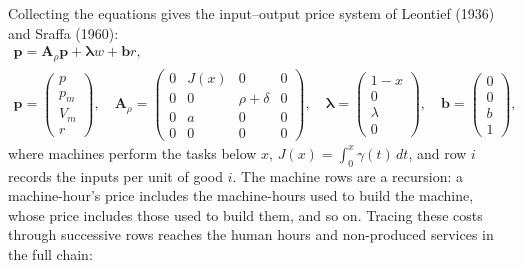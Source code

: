 \documentclass[12pt]{article}
\theoremstyle{plain}
\theoremstyle{definition}
\theoremstyle{remark}
\begin{document}
Collecting the equations gives the input--output price system of Leontief (1936) and Sraffa (1960):
\begin{equation}\label{eq:3}
\begin{gathered}
\mathbf p=\mathbf A_\rho\mathbf p+\bm\lambda w+\mathbf b r,\\
\mathbf p=\begin{pmatrix}p\\p_m\\V_m\\r\end{pmatrix},\quad
\mathbf A_\rho=\begin{pmatrix}0&J(x)&0&0\\0&0&\rho+\delta&0\\0&a&0&0\\0&0&0&0\end{pmatrix},\quad
\bm\lambda=\begin{pmatrix}1-x\\0\\\lambda\\0\end{pmatrix},\quad
\mathbf b=\begin{pmatrix}0\\0\\b\\1\end{pmatrix},
\end{gathered}
\end{equation}
where machines perform the tasks below $x$, $J(x)=\int_0^x\gamma(t)\,dt$, and row $i$ records the inputs per unit of good $i$. The machine rows are a recursion: a machine-hour's price includes the machine-hours used to build the machine, whose price includes those used to build them, and so on.
Tracing these costs through successive rows reaches the human hours and non-produced services in the full chain:
\end{document}
